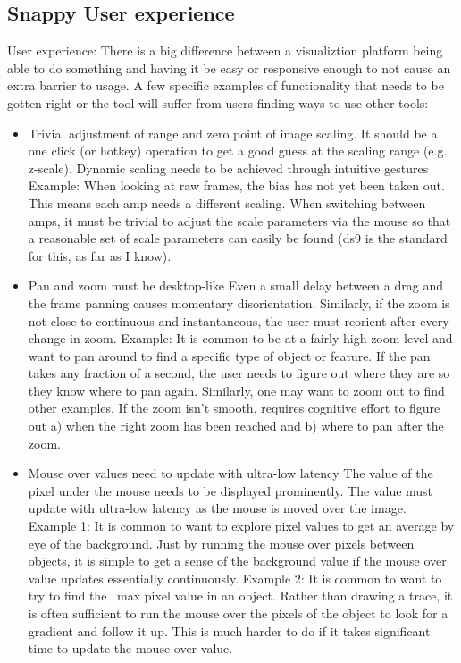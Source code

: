 \subsection{Snappy User experience}
User experience:
There is a big difference between a visualiztion platform being able to do something and having it be easy or responsive enough to not cause an extra barrier to usage.  A few specific examples of functionality that needs to be gotten right or the tool will suffer from users finding ways to use other tools:
\begin{itemize}

\item{Trivial adjustment of range and zero point of image scaling.
It should be a one click (or hotkey) operation to get a good guess at the scaling range (e.g. z-scale).
Dynamic scaling needs to be achieved through intuitive gestures
Example: When looking at raw frames, the bias has not yet been taken out.  This means each amp needs a different scaling.  When switching between amps, it must be trivial to adjust the scale parameters via the mouse so that a reasonable set of scale parameters can easily be found (ds9 is the standard for this, as far as I know).}
\item{Pan and zoom must be desktop-like
Even a small delay between a drag and the frame panning causes momentary disorientation.
Similarly, if the zoom is not close to continuous and instantaneous, the user must reorient after every change in zoom.
Example: It is common to be at a fairly high zoom level and want to pan around to find a specific type of object or feature.  If the pan takes any fraction of a second, the user needs to figure out where they are so they know where to pan again.  Similarly, one may want to zoom out to find other examples.  If the zoom isn't smooth, requires cognitive effort to figure out a) when the right zoom has been reached and b) where to pan after the zoom.}
\item{Mouse over values need to update with ultra-low latency
The value of the pixel under the mouse needs to be displayed prominently.
The value must update with ultra-low latency  as the mouse is moved over the image.
Example 1: It is common to want to explore pixel values to get an average by eye of the background.  Just by running the mouse over pixels between objects, it is simple to get a sense of the background value if the mouse over value updates essentially continuously.
Example 2: It is common to want to try to find the ~max pixel value in an object.  Rather than drawing a trace, it is often sufficient to run the mouse over the pixels of the object to look for a gradient and follow it up.  This is much harder to do if it takes significant time to update the mouse over value.
}
\end{itemize}
